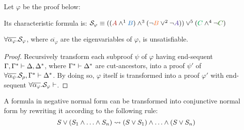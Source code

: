\begin{example}
\label{example:CutPertinentStruct}

Let $\varphi$ be the proof below:
\begin{prooftree}
		 
	 
						 
					 
					 
									 
								 
\end{prooftree}

\noindent
Its characteristic formula is:
$
\struct{\varphi} 
\equiv 
((\hA{A} \structplus^1 \hB{B}) \structplus^3 (\structdual{\hC{B}} \structtimes^2 \structdual{\hD{A}}))
\structtimes^5
(\hE{C} \structplus^4 \structdual{\hF{C}})
$
\hfill\QED
\end{example}

\begin{theorem}
\label{theorem:Unsatisfiability}
$\all \overline{\alpha_{\varphi}}. \struct{\varphi}$, where $\overline{\alpha_{\varphi}}$ are the eigenvariables of $\varphi$, is unsatisfiable.
\end{theorem}
\begin{proof}
Recursively transform each subproof $\psi$ of $\varphi$ having end-sequent $\Gamma, \Gamma^* \seq \Delta, \Delta^*$, where $\Gamma^* \seq \Delta^*$ are cut-ancestors, into a proof $\psi'$ of $\all \overline{\alpha_{\psi}}. \struct{\rho}, \Gamma^* \seq \Delta^*$. By doing so, $\varphi$ itself is transformed into a proof $\varphi'$ with end-sequent $\all \overline{\alpha_{\varphi}}. \struct{\varphi} \seq$.
\hfill\QED
\end{proof}






\begin{definition}
\label{definition:NormalizationPlusTimes}
A formula in negative normal form can be transformed into conjunctive normal form by rewriting it according to the following rule:
$$
S \structtimes (S_1 \structplus \ldots \structplus S_n)   \normalizePlusTimes  (S \structtimes S_1) \structplus \ldots \structplus (S \structtimes S_n) 
$$
\end{definition}


